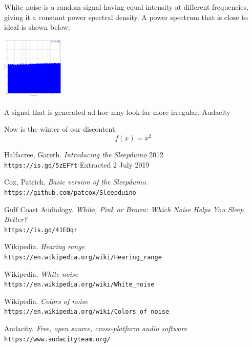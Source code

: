 \documentclass[a4paper,10pt]{article}
\begin{document}
White noise is a random signal having equal intensity at different frequencies, giving it a constant power spectral density\cite{wiki_white}. A power spectrum that is close to ideal is shown below\cite{wiki_colour}:

\begin{center}
\includegraphics[height=3cm]{wns.png}
\end{center}
 
A signal that is generated ad-hoc may look far more irregular. Audacity\cite{audacity}


Now is the winter of our discontent.
\begin{equation*}
  f(x) = x^2
\end{equation*}

\begin{thebibliography}{9}
 
Halfacree, Gareth.
\textit{Introducing the Sleepduino}
2012 
\\\texttt{https://is.gd/5zEFYt}
Extracted 2 July 2019



Cox, Patrick.
\textit{Basic version of the Sleepduino.}
\\\texttt{https://github.com/patcox/Sleepduino}

Gulf Coast Audiology.
\textit{White, Pink or Brown: Which Noise Helps You Sleep Better?}
\\\texttt{https://is.gd/41EOqr}

Wikipedia.
\textit{Hearing range}
\\\texttt{https://en.wikipedia.org/wiki/Hearing\_range}

Wikipedia.
\textit{White noise}
\\\texttt{https://en.wikipedia.org/wiki/White\_noise}

Wikipedia.
\textit{Colors of noise}
\\\texttt{https://en.wikipedia.org/wiki/Colors\_of\_noise}

Audacity.
\textit{Free, open source, cross-platform audio software}
\\\texttt{https://www.audacityteam.org/}

\end{thebibliography}
\end{document}
